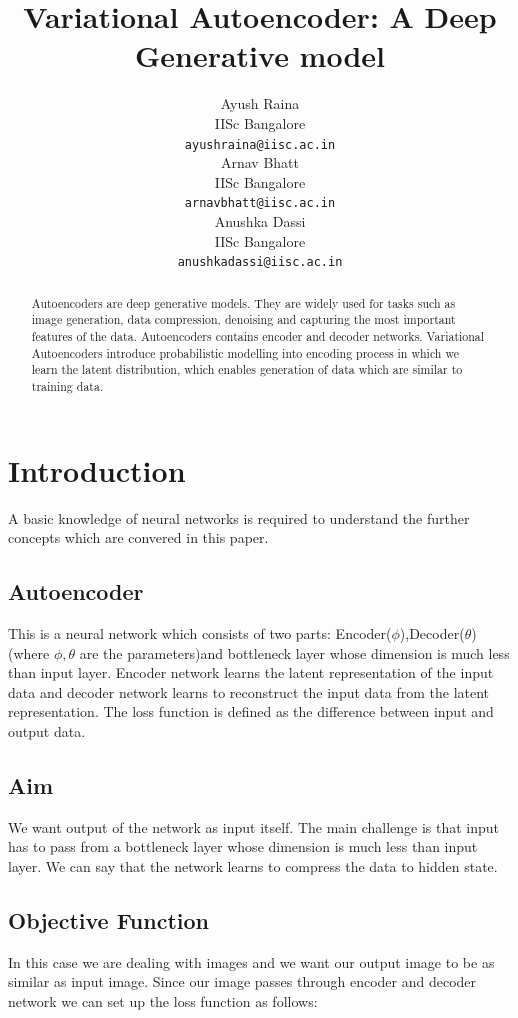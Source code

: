 \documentclass[10pt,a4paper]{article}
\title{Variational Autoencoder: A Deep Generative model}
\author{
  Ayush Raina \\
  IISc Bangalore \\
  \texttt{ayushraina@iisc.ac.in} \\
  \And
  Arnav Bhatt \\
  IISc Bangalore \\
  \texttt{arnavbhatt@iisc.ac.in} \\
  \AND
  Anushka Dassi \\
  IISc Bangalore \\
  \texttt{anushkadassi@iisc.ac.in} \\
}
\begin{document}
\maketitle


\begin{abstract}
  Autoencoders are deep generative models. They are widely used for tasks such as image generation, data compression, denoising and capturing the most important features of the data. Autoencoders contains encoder and decoder networks. Variational Autoencoders introduce probabilistic modelling into encoding process in which we learn the latent distribution, which enables generation of data which are similar to training data.
\end{abstract}


\section{Introduction}
A basic knowledge of neural networks is required to understand the further concepts which are convered in this paper.

\subsection{Autoencoder}
This is a neural network which consists of two parts: Encoder($\phi$),Decoder($\theta$) (where $\phi, \theta$ are the parameters)and bottleneck layer whose dimension is much less than input layer. Encoder network learns the latent representation of the input data and decoder network learns to reconstruct the input data from the latent representation. The loss function is defined as the difference between input and output data.

\subsection{Aim}
We want output of the network as input itself. The main challenge is that input has to pass from a bottleneck layer whose dimension is much less than input layer. We can say that the network learns to compress the data to hidden state.

\subsection{Objective Function}
In this case we are dealing with images and we want our output image to be as similar as input image. Since our image passes through encoder and decoder network we can set up the loss function as follows:
\end{document}

